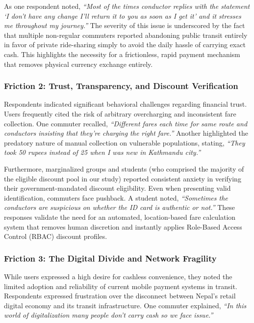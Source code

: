 \documentclass[manuscript,review,anonymous]{acmart}
\begin{document}
As one respondent noted, \textit{``Most of the times conductor replies with the statement `I don't have any change I'll return it to you as soon as I get it' and it stresses me throughout my journey.''} The severity of this issue is underscored by the fact that multiple non-regular commuters reported abandoning public transit entirely in favor of private ride-sharing simply to avoid the daily hassle of carrying exact cash. This highlights the necessity for a frictionless, rapid payment mechanism that removes physical currency exchange entirely.

\subsubsection{Friction 2: Trust, Transparency, and Discount Verification}
Respondents indicated significant behavioral challenges regarding financial trust. Users frequently cited the risk of arbitrary overcharging and inconsistent fare collection. One commuter recalled, \textit{``Different fares each time for same route and conductors insisting that they're charging the right fare.''} Another highlighted the predatory nature of manual collection on vulnerable populations, stating, \textit{``They took 50 rupees instead of 25 when I was new in Kathmandu city.''}

Furthermore, marginalized groups and students (who comprised the majority of the eligible discount pool in our study) reported consistent anxiety in verifying their government-mandated discount eligibility. Even when presenting valid identification, commuters face pushback. A student noted, \textit{``Sometimes the conductors are suspicious on whether the ID card is authentic or not.''} These responses validate the need for an automated, location-based fare calculation system that removes human discretion and instantly applies Role-Based Access Control (RBAC) discount profiles.

\subsubsection{Friction 3: The Digital Divide and Network Fragility}
While users expressed a high desire for cashless convenience, they noted the limited adoption and reliability of current mobile payment systems in transit. Respondents expressed frustration over the disconnect between Nepal's retail digital economy and its transit infrastructure. One commuter explained, \textit{``In this world of digitalization many people don't carry cash so we face issue.''}
\end{document}
